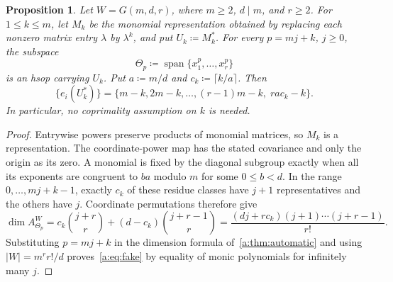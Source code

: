 \documentclass[11pt]{amsart}
\newcommand{\defeq}{\coloneqq}
\newtheorem{proposition}[theorem]{Proposition}
\theoremstyle{definition}
\begin{document}
\begin{proposition}\label{a:prop:monomial}
Let $W=G(m,d,r)$, where $m\ge2$, $d\mid m$, and $r\ge2$. For
$1\le k\le m$, let $M_k$ be the monomial representation obtained by
replacing each nonzero matrix entry $\lambda$ by $\lambda^k$, and put
$U_k\defeq M_k^*$. For every $p=mj+k$, $j\ge0$, the subspace
\[
 \Theta_p\defeq\operatorname{span}\{x_1^p,\ldots,x_r^p\}
\]
is an hsop carrying $U_k$. Put $a\defeq m/d$ and $c_k\defeq\lceil k/a\rceil$.
Then
\begin{equation}\label{a:eq:fake}
 \{e_i(U_k^*)\}
 =\{m-k,2m-k,\ldots,(r-1)m-k,\;ra c_k-k\}.
\end{equation}
In particular, no coprimality assumption on $k$ is needed.
\end{proposition}

\begin{proof}
Entrywise powers preserve products of monomial matrices, so $M_k$ is
a representation. The coordinate-power map has the stated covariance
and only the origin as its zero. A monomial is fixed by the diagonal
subgroup exactly when all its exponents are congruent to $ba$ modulo
$m$ for some $0\le b<d$. In the range $0,\ldots,mj+k-1$, exactly
$c_k$ of these residue classes have $j+1$ representatives and the others
have $j$. Coordinate permutations therefore give
\[
 \dim A_{\Theta_p}^W=c_k\binom{j+r}{r}+(d-c_k)\binom{j+r-1}{r}
 =\frac{(dj+rc_k)(j+1)\cdots(j+r-1)}{r!}.
\]
Substituting $p=mj+k$ in the dimension formula of~\cref{a:thm:automatic} and using
$|W|=m^r r!/d$ proves~\cref{a:eq:fake} by equality of monic polynomials
for infinitely many $j$.
\end{proof}
\end{document}
